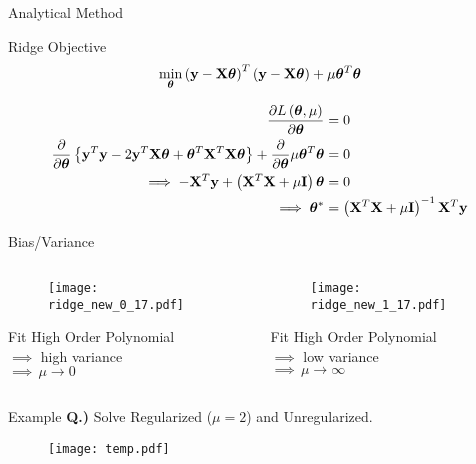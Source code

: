 \documentclass{beamer}
\begin{document}
\begin{frame}{Analytical Method}
\begin{tcolorbox}{Ridge Objective}
\vspace{-0.4cm}
$$
\min_{\boldsymbol{\theta}} \left(\mathbf{y}-\mathbf{X}\boldsymbol{\theta}\right)^T\left(\mathbf{y}-\mathbf{X}\boldsymbol{\theta}\right)+ \mu\boldsymbol{\theta}^T\boldsymbol{\theta}
$$
\end{tcolorbox}
\begin{align*}
\frac{\partial L\left(\boldsymbol{\theta}, \mu\right)}{\partial \boldsymbol{\theta}} &= 0 \\ 
\frac{\partial}{\partial \boldsymbol{\theta}}\left\lbrace \mathbf{y}^T\mathbf{y} - 2\mathbf{y}^T\mathbf{X}\boldsymbol{\theta} + \boldsymbol{\theta}^T\mathbf{X}^T\mathbf{X}\boldsymbol{\theta} \right\rbrace +  \frac{\partial}{\partial \boldsymbol{\theta}} \mu\boldsymbol{\theta}^T\boldsymbol{\theta} &= 0 \\
\implies -\mathbf{X}^T\mathbf{y} + \left(\mathbf{X}^T\mathbf{X} + \mu \mathbf{I}\right)\boldsymbol{\theta} &= 0 \\
\implies \boldsymbol{\theta}^* &= \left(\mathbf{X}^T\mathbf{X} + \mu \mathbf{I}\right)^{-1}\mathbf{X}^T\mathbf{y}
\end{align*}
\end{frame}

\begin{frame}{Bias/Variance}
\begin{columns}
\begin{column}{0.4\textwidth}
\begin{figure}
\texttt{[image: ridge\_new\_0\_17.pdf]}
\end{figure}
Fit High Order Polynomial \\
$\implies$ high variance \\
$\implies \, \mu \rightarrow 0$
\end{column}
\begin{column}{0.4\textwidth}
\begin{figure}
\texttt{[image: ridge\_new\_1\_17.pdf]}
\end{figure}
Fit High Order Polynomial \\
$\implies$ low variance \\
$\implies \, \mu \rightarrow \infty$
\end{column}
\end{columns}
\end{frame}

\begin{frame}{Example}
\vspace{0.4cm}
\textbf{Q.)} Solve Regularized ($\mu = 2$) and Unregularized.
\vspace{-0.6cm}
\begin{figure}
\texttt{[image: temp.pdf]}
\end{figure}
\end{frame}
\end{document}
